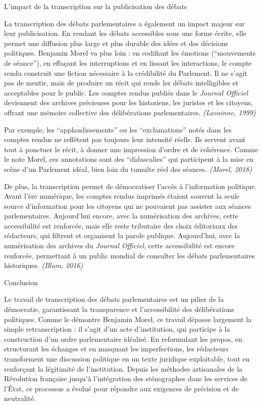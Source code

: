  L'impact de la transcription sur la publicisation des débats

La transcription des débats parlementaires a également un impact majeur sur leur publicisation. En rendant les débats accessibles sous une forme écrite, elle permet une diffusion plus large et plus durable des idées et des décisions politiques. Benjamin Morel va plus loin : en codifiant les émotions (\enquote{mouvements de séance}), en effaçant les interruptions et en lissant les interactions, le compte rendu construit une fiction nécessaire à la crédibilité du Parlement. Il ne s’agit pas de mentir, mais de produire un récit qui rende les débats intelligibles et acceptables pour le public. Les comptes rendus publiés dans le \emph{Journal Officiel} deviennent des archives précieuses pour les historiens, les juristes et les citoyens, offrant une mémoire collective des délibérations parlementaires. \emph{(Lavoinne, 1999)}

Par exemple, les \enquote{applaudissements} ou les \enquote{exclamations} notés dans les comptes rendus ne reflètent pas toujours leur intensité réelle. Ils servent avant tout à ponctuer le récit, à donner une impression d’ordre et de cohérence. Comme le note Morel, ces annotations sont des \enquote{didascalies} qui participent à la mise en scène d’un Parlement idéal, bien loin du tumulte réel des séances. \emph{(Morel, 2018)}

De plus, la transcription permet de démocratiser l'accès à l'information politique. Avant l'ère numérique, les comptes rendus imprimés étaient souvent la seule source d'information pour les citoyens qui ne pouvaient pas assister aux séances parlementaires. Aujourd’hui encore, avec la numérisation des archives, cette accessibilité est renforcée, mais elle reste tributaire des choix éditoriaux des rédacteurs, qui filtrent et organisent la parole publique. Aujourd'hui, avec la numérisation des archives du \emph{Journal Officiel}, cette accessibilité est encore renforcée, permettant à un public mondial de consulter les débats parlementaires historiques. \emph{(Blum, 2016)}

Conclusion

Le travail de transcription des débats parlementaires est un pilier de la démocratie, garantissant la transparence et l'accessibilité des délibérations politiques. Comme le démontre Benjamin Morel, ce travail dépasse largement la simple retranscription : il s’agit d’un acte d’institution, qui participe à la construction d’un ordre parlementaire idéalisé. En reformulant les propos, en structurant les échanges et en masquant les imperfections, les rédacteurs transforment une discussion politique en un texte juridique exploitable, tout en renforçant la légitimité de l’institution. Depuis les méthodes artisanales de la Révolution française jusqu'à l'intégration des sténographes dans les services de l'État, ce processus a évolué pour répondre aux exigences de précision et de neutralité.

